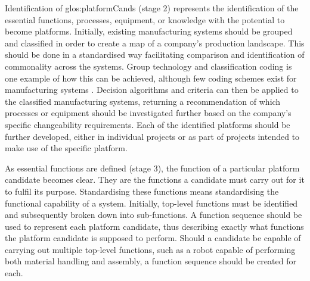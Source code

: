 Identification of \gls{glos:platformCand}s (stage 2) represents the identification of the essential functions, processes, equipment, or knowledge with the potential to become platforms.
Initially, existing manufacturing systems should be grouped and classified in order to create a map of a company's production landscape.
This should be done in a standardised way facilitating comparison and identification of commonality across the systems.
Group technology and classification coding is one example of how this can be achieved, although few coding schemes exist for manufacturing systems \parencite{ElMaraghy2006Complexity,elmaraghy2010classification}.
Decision algorithms and criteria can then be applied to the classified manufacturing systems, returning a recommendation of which processes or equipment should be investigated further based on the company's specific changeability requirements.
Each of the identified platforms should be further developed, either in individual projects or as part of projects intended to make use of the specific platform. 

As essential functions are defined (stage 3), the function of a particular platform candidate becomes clear.
They are the functions a candidate must carry out for it to fulfil its purpose.
Standardising these functions means standardising the functional capability of a system.
Initially, top-level functions must be identified and subsequently broken down into sub-functions.
A function sequence should be used to represent each platform candidate, thus describing exactly what functions the platform candidate is supposed to perform.
Should a candidate be capable of carrying out multiple top-level functions, such as a robot capable of performing both material handling and assembly, a function sequence should be created for each.

